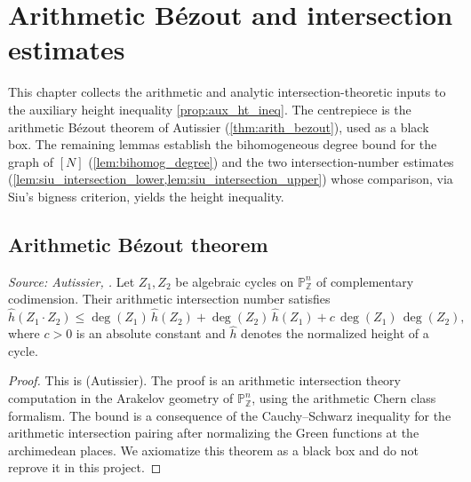 \chapter{Arithmetic Bézout and intersection estimates}
\label{chap:arithbezout}


This chapter collects the arithmetic and analytic intersection-theoretic inputs
to the auxiliary height inequality \cref{prop:aux_ht_ineq}. The centrepiece is
the arithmetic Bézout theorem of Autissier (\cref{thm:arith_bezout}), used as a
black box. The remaining lemmas establish the bihomogeneous degree bound for the
graph of \([N]\) (\cref{lem:bihomog_degree}) and the two intersection-number
estimates (\cref{lem:siu_intersection_lower,lem:siu_intersection_upper}) whose
comparison, via Siu's bigness criterion, yields the height inequality.

\section{Arithmetic Bézout theorem}

\begin{theorem}
  \label{thm:arith_bezout}
  \textit{Source: Autissier, \cite[Théorème~3]{HauteursAlt3}.}
  Let \(Z_1, Z_2\) be algebraic cycles on \(\mathbb{P}^n_{\mathbb{Z}}\) of
  complementary codimension. Their arithmetic intersection number satisfies
  \[
    \hat{h}(Z_1 \cdot Z_2)
    \le \deg(Z_1)\,\hat{h}(Z_2)
       + \deg(Z_2)\,\hat{h}(Z_1)
       + c\,\deg(Z_1)\,\deg(Z_2),
  \]
  where \(c > 0\) is an absolute constant and \(\hat{h}\) denotes the
  normalized height of a cycle.
\end{theorem}

\begin{proof}
  This is \cite[Théorème~3]{HauteursAlt3} (Autissier). The proof is an arithmetic
  intersection theory computation in the Arakelov geometry of \(\mathbb{P}^n_{\mathbb{Z}}\),
  using the arithmetic Chern class formalism. The bound is a consequence of the
  Cauchy--Schwarz inequality for the arithmetic intersection pairing after normalizing
  the Green functions at the archimedean places. We axiomatize this theorem as a
  black box and do not reprove it in this project.
\end{proof}

